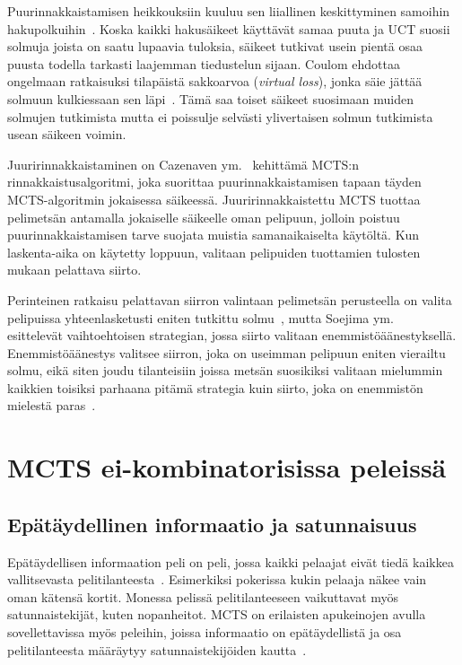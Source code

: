 \documentclass[12pt,finnish]{tktltiki2}
\theoremstyle{definition}
\theoremstyle{remark}
\begin{document}
Puurinnakkaistamisen heikkouksiin kuuluu sen liiallinen keskittyminen samoihin hakupolkuihin~\cite{browne, chaslot}. Koska kaikki hakusäikeet käyttävät samaa puuta ja UCT suosii solmuja joista on saatu lupaavia tuloksia, säikeet tutkivat usein pientä osaa puusta todella tarkasti laajemman tiedustelun sijaan. Coulom ehdottaa ongelmaan ratkaisuksi tilapäistä sakkoarvoa (\textit{virtual loss}), jonka säie jättää solmuun kulkiessaan sen läpi~\cite{chaslot}. Tämä saa toiset säikeet suosimaan muiden solmujen tutkimista mutta ei poissulje selvästi ylivertaisen solmun tutkimista usean säikeen voimin.

Juuririnnakkaistaminen on Cazenaven ym.~\cite{cazenave} kehittämä MCTS:n rinnakkaistusalgoritmi, joka suorittaa puurinnakkaistamisen tapaan täyden MCTS-algoritmin jokaisessa säikeessä. Juuririnnakkaistettu MCTS tuottaa pelimetsän antamalla jokaiselle säikeelle oman pelipuun, jolloin poistuu puurinnakkaistamisen tarve suojata muistia samanaikaiselta käytöltä. Kun laskenta-aika on käytetty loppuun, valitaan pelipuiden tuottamien tulosten mukaan pelattava siirto.

Perinteinen ratkaisu pelattavan siirron valintaan pelimetsän perusteella on valita pelipuissa yhteenlasketusti eniten tutkittu solmu~\cite{browne}, mutta Soejima ym.~\cite{soejima} esittelevät vaihtoehtoisen strategian, jossa siirto valitaan enemmistöäänestyksellä. Enemmistöäänestys valitsee siirron, joka on useimman pelipuun eniten vierailtu solmu, eikä siten joudu tilanteisiin joissa metsän suosikiksi valitaan mielummin kaikkien toisiksi parhaana pitämä strategia kuin siirto, joka on enemmistön mielestä paras~\cite{soejima}.


\section{MCTS ei-kombinatorisissa peleissä}

\subsection{Epätäydellinen informaatio ja satunnaisuus}

Epätäydellisen informaation peli on peli, jossa kaikki pelaajat eivät tiedä kaikkea vallitsevasta pelitilanteesta~\cite{browne}. Esimerkiksi pokerissa kukin pelaaja näkee vain oman kätensä kortit. Monessa pelissä pelitilanteeseen vaikuttavat myös satunnaistekijät, kuten nopanheitot. MCTS on erilaisten apukeinojen avulla sovellettavissa myös peleihin, joissa informaatio on epätäydellistä ja osa pelitilanteesta määräytyy satunnaistekijöiden kautta~\cite{browne}.
\end{document}
